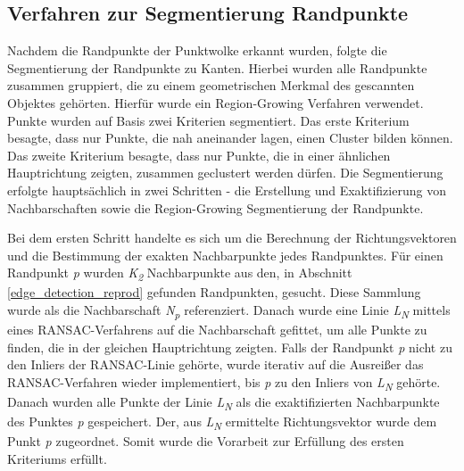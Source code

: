 \subsection{Verfahren zur Segmentierung Randpunkte}
Nachdem die Randpunkte der Punktwolke erkannt wurden, folgte die Segmentierung der Randpunkte zu Kanten. Hierbei wurden alle Randpunkte zusammen gruppiert, die zu einem geometrischen Merkmal des gescannten Objektes gehörten. Hierfür wurde ein Region-Growing Verfahren verwendet. Punkte wurden auf Basis zwei Kriterien segmentiert. Das erste Kriterium besagte, dass nur Punkte, die nah aneinander lagen, einen Cluster bilden können. Das zweite Kriterium besagte, dass nur Punkte, die in einer ähnlichen Hauptrichtung zeigten, zusammen geclustert werden dürfen. Die Segmentierung erfolgte hauptsächlich in zwei Schritten - die Erstellung und Exaktifizierung von Nachbarschaften sowie die Region-Growing Segmentierung der Randpunkte.

Bei dem ersten Schritt handelte es sich um die Berechnung der Richtungsvektoren und die Bestimmung der exakten Nachbarpunkte jedes Randpunktes. Für einen Randpunkt \textit{p} wurden \textit{K\textsubscript{2}} Nachbarpunkte aus den, in Abschnitt \ref{edge_detection_reprod} gefunden Randpunkten, gesucht. Diese Sammlung wurde als die Nachbarschaft \textit{N\textsubscript{p}} referenziert. Danach wurde eine Linie \textit{L\textsubscript{N}} mittels eines RANSAC-Verfahrens auf die Nachbarschaft gefittet, um alle Punkte zu finden, die in der gleichen Hauptrichtung zeigten. Falls der Randpunkt \textit{p} nicht zu den Inliers der RANSAC-Linie gehörte, wurde iterativ auf die Ausreißer das RANSAC-Verfahren wieder implementiert, bis \textit{p} zu den Inliers von \textit{L\textsubscript{N}} gehörte. Danach wurden alle Punkte der Linie \textit{L\textsubscript{N}} als die exaktifizierten Nachbarpunkte des Punktes \textit{p} gespeichert. Der, aus \textit{L\textsubscript{N}} ermittelte Richtungsvektor wurde dem Punkt \textit{p} zugeordnet. Somit wurde die Vorarbeit zur Erfüllung des ersten Kriteriums erfüllt.

